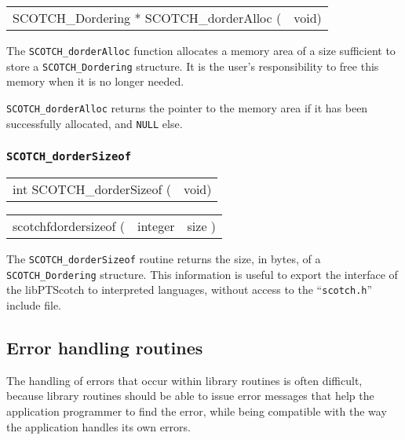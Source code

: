\begin{itemize}
\progsyn

{\tt\begin{tabular}{l@{}l}
SCOTCH\_Dordering * SCOTCH\_dorderAlloc ( & void)
\end{tabular}}

\progdes

The {\tt SCOTCH\_dorderAlloc} function allocates a memory area of a
size sufficient to store a {\tt SCOTCH\_\lbt Dordering} structure. It is
the user's responsibility to free this memory when it is no longer
needed.

\progret

{\tt SCOTCH\_dorderAlloc} returns the pointer to the memory area if it
has been successfully allocated, and {\tt NULL} else.
\end{itemize}

\subsubsection{{\tt SCOTCH\_dorderSizeof}}

\begin{itemize}
\progsyn

{\tt\begin{tabular}{l@{}l}
int SCOTCH\_dorderSizeof ( & void)
\end{tabular}}

{\tt\begin{tabular}{l@{}ll}
scotchfdordersizeof ( & integer & size )
\end{tabular}}

\progdes

The {\tt SCOTCH\_dorderSizeof} routine returns the size, in bytes, of a
{\tt SCOTCH\_\lbt Dordering} structure. This information is useful to
export the interface of the {\sc libPTScotch} to interpreted languages,
without access to the ``{\tt scotch.h}'' include file.
\end{itemize}

\subsection{Error handling routines}
\label{sec-lib-error}

The handling of errors that occur within library routines is
often difficult, because library routines should be able to issue
error messages that help the application programmer to find the
error, while being compatible with the way the application handles
its own errors.

